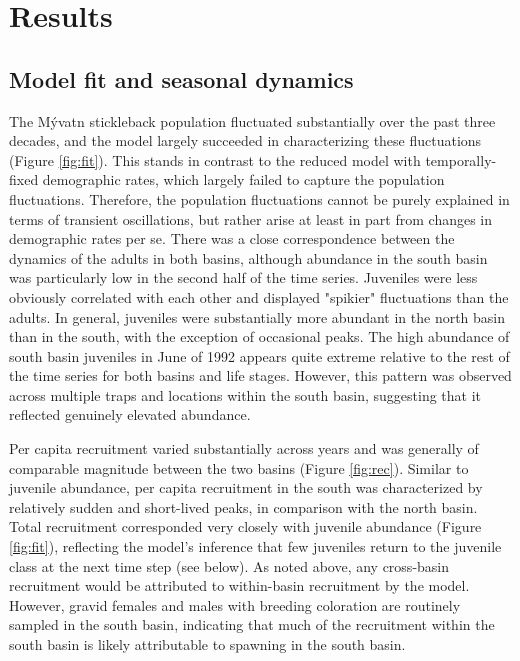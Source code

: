 \section*{Results}



\subsection*{Model fit and seasonal dynamics} 

The M\'{y}vatn stickleback population fluctuated substantially over the past
three decades, 
and the model largely succeeded in characterizing these fluctuations 
(Figure \ref{fig:fit}).
This stands in contrast to the reduced model with temporally-fixed demographic rates,
which largely failed to capture the population fluctuations.
Therefore, the population fluctuations cannot be purely explained in terms of transient
oscillations, but rather arise at least in part from changes in demographic rates per se. 
There was a close correspondence between the dynamics of the adults in both basins,
although abundance in the south basin was particularly low 
in the second half of the time series.
Juveniles were less obviously correlated with each other 
and displayed "spikier" fluctuations than the adults.
In general, juveniles were substantially more abundant in the north basin than in the south,
with the exception of occasional peaks. 
The high abundance of south basin juveniles in June of 1992 appears quite extreme
relative to the rest of the time series for both basins and life stages.
However, this pattern was observed across multiple traps and locations within the south basin,
suggesting that it reflected genuinely elevated abundance.

Per capita recruitment varied substantially across years and was generally of comparable
magnitude between the two basins (Figure \ref{fig:rec}).
Similar to juvenile abundance, per capita recruitment in the south 
was characterized by relatively sudden and short-lived peaks, 
in comparison with the north basin.
Total recruitment corresponded very closely with juvenile abundance (Figure \ref{fig:fit}),
reflecting the model's inference 
that few juveniles return to the juvenile class at the next time step (see below).
As noted above, 
any cross-basin recruitment would be attributed 
to within-basin recruitment by the model. 
However, gravid females and males with breeding coloration are routinely sampled in the 
south basin, indicating that much of the recruitment within the south basin is 
likely attributable to spawning in the south basin.

